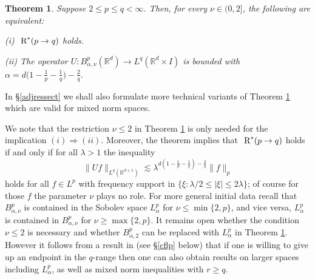 \documentclass[11pt]{amsart}
\newtheorem{theorem}{Theorem}[section]
\theoremstyle{definition}
\numberwithin{theorem}{section}
\numberwithin{definition}{section}
\numberwithin{equation}{section}
\renewcommand{\le}{\leqslant}
\renewcommand{\ge}{\geqslant}
\def\lc{\lesssim}
\def\la{\lambda}             \def\La{\Lambda}
\def\bbR{{\mathbb {R}}}
\renewcommand{\le}{\leqslant}
\renewcommand{\ge}{\geqslant}
\begin{document}
\begin{theorem} \label{besov-vs-ext}
Suppose $2\le p\le q<\infty$.
Then, for every $\nu\in (0,2]$,  the following are equivalent:

(i) $\text{ \rm R}^*(p\to q)$ holds.

(ii) The operator $U: B^p_{\alpha,\nu}(\bbR^d)
\to L^q(\bbR^{d}\times
I)$ is bounded with
 $\alpha= d\big(1-\frac 1p-\frac{1}{q}\big)-\frac{2}q.$
\end{theorem}
In \S \ref{adjressect} we shall also formulate more technical
variants of Theorem \ref{besov-vs-ext} which are valid for mixed
norm spaces.

We note that the restriction $\nu\le 2$ in Theorem
\ref{besov-vs-ext}  is only needed for the implication $(i)\! \Rightarrow \!(ii)$. Moreover, the theorem implies  that
 $\text{ \rm R}^*(p\to q)$  holds if and only if for all $\la>1$
the inequality
$$\|Uf\|_{L^q(\bbR^{d+1})} \lc \la^{ d(1-\frac 1p-\frac{1}{q})-\frac{2}q} \|f\|_p$$
holds for all $f\in L^p$ with frequency support  in $\{\xi:\la/2\le |\xi|\le
2\la\}$;  of course for those $f$ the parameter $\nu$ plays no role.
For more general initial data recall that   $B^p_{\alpha,\nu}$
is contained in the Sobolev space
$L^p_\alpha$ for $\nu\le \min \{2,p\}$, and vice versa,
$L^p_\alpha$ is contained in
$B^p_{\alpha,\nu}$
for $\nu\ge \max \{2,p\}$.
It remains open whether the condition $\nu\le 2$ is necessary  and
 whether $B^p_{\alpha,2}$ can be replaced
with $L^p_\alpha$ in Theorem \ref{besov-vs-ext}.
However it follows from a result in  \cite{lerose} (see \S\ref{cflp} below)
that if one is willing to give up an endpoint in the $q$-range
then one can also
obtain results on  larger spaces including  $L^p_\alpha$, as well as mixed norm inequalities with  $r\ge q$.
\end{document}
